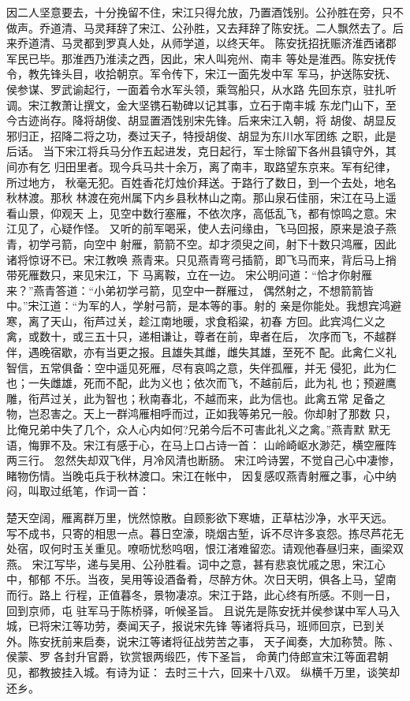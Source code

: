因二人坚意要去，十分挽留不住，宋江只得允放，乃置酒饯别。公孙胜在旁，只不
做声。乔道清、马灵拜辞了宋江、公孙胜，又去拜辞了陈安抚。二人飘然去了。后
来乔道清、马灵都到罗真人处，从师学道，以终天年。
陈安抚招抚赈济淮西诸郡军民已毕。那淮西乃淮渎之西，因此，宋人叫宛州、南丰
等处是淮西。陈安抚传令，教先锋头目，收拾朝京。军令传下，宋江一面先发中军
军马，护送陈安抚、侯参谋、罗武谕起行，一面着令水军头领，乘驾船只，从水路
先回东京，驻扎听调。宋江教萧让撰文，金大坚镌石勒碑以记其事，立石于南丰城
东龙门山下，至今古迹尚存。降将胡俊、胡显置酒饯别宋先锋。后来宋江入朝，将
胡俊、胡显反邪归正，招降二将之功，奏过天子，特授胡俊、胡显为东川水军团练
之职，此是后话。
当下宋江将兵马分作五起进发，克日起行，军士除留下各州县镇守外，其间亦有乞
归田里者。现今兵马共十余万，离了南丰，取路望东京来。军有纪律，所过地方，
秋毫无犯。百姓香花灯烛价拜送。于路行了数日，到一个去处，地名秋林渡。那秋
林渡在宛州属下内乡县秋林山之南。那山泉石佳丽，宋江在马上遥看山景，仰观天
上，见空中数行塞雁，不依次序，高低乱飞，都有惊鸣之意。宋江见了，心疑作怪。
又听的前军喝采，使人去问缘由，飞马回报，原来是浪子燕青，初学弓箭，向空中
射雁，箭箭不空。却才须臾之间，射下十数只鸿雁，因此诸将惊讶不已。宋江教唤
燕青来。只见燕青弯弓插箭，即飞马而来，背后马上捎带死雁数只，来见宋江，下
马离鞍，立在一边。
宋公明问道：“恰才你射雁来？”燕青答道：“小弟初学弓箭，见空中一群雁过，
偶然射之，不想箭箭皆中。”宋江道：“为军的人，学射弓箭，是本等的事。射的
亲是你能处。我想宾鸿避寒，离了天山，衔芦过关，趁江南地暖，求食稻粱，初春
方回。此宾鸿仁义之禽，或数十，或三五十只，递相谦让，尊者在前，卑者在后，
次序而飞，不越群伴，遇晚宿歇，亦有当更之报。且雄失其雌，雌失其雄，至死不
配。此禽仁义礼智信，五常俱备：空中遥见死雁，尽有哀鸣之意，失伴孤雁，并无
侵犯，此为仁也；一失雌雄，死而不配，此为义也；依次而飞，不越前后，此为礼
也；预避鹰雕，衔芦过关，此为智也；秋南春北，不越而来，此为信也。此禽五常
足备之物，岂忍害之。天上一群鸿雁相呼而过，正如我等弟兄一般。你却射了那数
只，比俺兄弟中失了几个，众人心内如何?兄弟今后不可害此礼义之禽。”燕青默
默无语，悔罪不及。宋江有感于心，在马上口占诗一首：
山岭崎岖水渺茫，横空雁阵两三行。
忽然失却双飞伴，月冷风清也断肠。
宋江吟诗罢，不觉自己心中凄惨，睹物伤情。当晚屯兵于秋林渡口。宋江在帐中，
因复感叹燕青射雁之事，心中纳闷，叫取过纸笔，作词一首：

楚天空阔，雁离群万里，恍然惊散。自顾影欲下寒塘，正草枯沙净，水平天远。
写不成书，只寄的相思一点。暮日空濠，晓烟古堑，诉不尽许多哀怨。拣尽芦花无
处宿，叹何时玉关重见。嘹呖忧愁呜咽，恨江渚难留恋。请观他春昼归来，画梁双
燕。
宋江写毕，递与吴用、公孙胜看。词中之意，甚有悲哀忧戚之思，宋江心中，郁郁
不乐。当夜，吴用等设酒备肴，尽醉方休。次日天明，俱各上马，望南而行。路上
行程，正值暮冬，景物凄凉。宋江于路，此心终有所感。不则一日，回到京师，屯
驻军马于陈桥驿，听候圣旨。
且说先是陈安抚并侯参谋中军人马入城，已将宋江等功劳，奏闻天子，报说宋先锋
等诸将兵马，班师回京，已到关外。陈安抚前来启奏，说宋江等诸将征战劳苦之事，
天子闻奏，大加称赞。陈、侯蒙、罗各封升官爵，钦赏银两缎匹，传下圣旨，
命黄门侍郎宣宋江等面君朝见，都教披挂入城。有诗为证：
去时三十六，回来十八双。
纵横千万里，谈笑却还乡。

